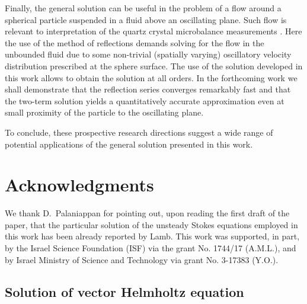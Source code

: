 \documentclass[aps,prx,twocolumn,amsmath,amssymb,amsfonts]{revtex4-2}
\begin{document}
{{Finally, the general solution can be useful in the problem of a flow around a spherical particle suspended in a fluid above an oscillating plane. Such flow is relevant to interpretation of the quartz crystal microbalance measurements \cite{Busca}. Here the use of the method of reflections \cite{hb} demands solving for the flow in the unbounded fluid due to some non-trivial (spatially varying) oscillatory velocity distribution prescribed at the sphere surface. The use of the solution developed in this work allows to obtain the solution at all orders. In the forthcoming work we shall demonstrate that the reflection series converges remarkably fast and that the two-term solution yields a quantitatively accurate approximation even at small proximity of the particle to the oscillating plane.

To conclude, these prospective research directions suggest a wide range of potential applications of the general solution presented in this work.

\section{Acknowledgments}

We thank D.~Palaniappan for pointing out, upon reading the first draft of the paper, that the particular solution of the unsteady Stokes equations employed in this work has been already reported by Lamb. This work was supported, in part, by the Israel Science Foundation (ISF) via the grant No. 1744/17 (A.M.L.), and by Israel Ministry of Science and Technology via grant No. 3-17383 (Y.O.).




\pagebreak
\begin{appendices}

\section{Solution of vector Helmholtz equation}
\label{solutionH}



\end{appendices}}}
\end{document}
